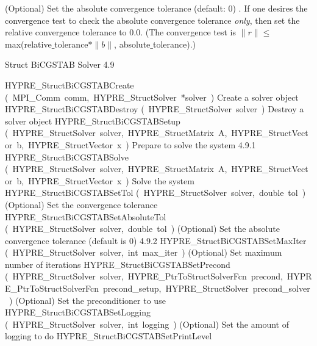 \documentclass{article}
\begin{document}
\begin{cxxentry}
\begin{cxxentry}
\begin{cxxfunction}
\begin{cxxdoc}
(Optional) Set the absolute convergence tolerance (default: 0) .
If one desires
the convergence test to check the absolute convergence tolerance {\it only}, then
set the relative convergence tolerance to 0.0.  (The convergence test is 
$\|r\| \leq$ max(relative$\_$tolerance$\ast \|b\|$, absolute$\_$tolerance).)
\end{cxxdoc}
\end{cxxfunction}
\end{cxxentry}
\begin{cxxentry}
{}
        {Struct BiCGSTAB Solver}
        {}
        {
}
        {4.9}
\begin{cxxnames}
        {HYPRE\_StructBiCGSTABCreate}
        {(\ MPI\_Comm\ comm,\ HYPRE\_StructSolver\ *solver\ )}
        {
Create a solver object}
        {}
\label{cxx.4.9.3}
        {HYPRE\_StructBiCGSTABDestroy}
        {(\ HYPRE\_StructSolver\ solver\ )}
        {
Destroy a solver object}
        {}
\label{cxx.4.9.4}
        {HYPRE\_StructBiCGSTABSetup}
        {(\ HYPRE\_StructSolver\ solver,\ HYPRE\_StructMatrix\ A,\ HYPRE\_StructVector\ b,\ HYPRE\_StructVector\ x\ )}
        {
Prepare to solve the system}
        {4.9.1}
        {HYPRE\_StructBiCGSTABSolve}
        {(\ HYPRE\_StructSolver\ solver,\ HYPRE\_StructMatrix\ A,\ HYPRE\_StructVector\ b,\ HYPRE\_StructVector\ x\ )}
        {
Solve the system}
        {}
\label{cxx.4.9.5}
        {HYPRE\_StructBiCGSTABSetTol}
        {(\ HYPRE\_StructSolver\ solver,\ double\ tol\ )}
        {
(Optional) Set the convergence tolerance}
        {}
\label{cxx.4.9.6}
        {HYPRE\_StructBiCGSTABSetAbsoluteTol}
        {(\ HYPRE\_StructSolver\ solver,\ double\ tol\ )}
        {
(Optional) Set the absolute convergence tolerance (default is 0)}
        {4.9.2}
        {HYPRE\_StructBiCGSTABSetMaxIter}
        {(\ HYPRE\_StructSolver\ solver,\ int\ max\_iter\ )}
        {
(Optional) Set maximum number of iterations}
        {}
\label{cxx.4.9.7}
        {HYPRE\_StructBiCGSTABSetPrecond}
        {(\ HYPRE\_StructSolver\ solver,\ HYPRE\_PtrToStructSolverFcn\ precond,\ HYPRE\_PtrToStructSolverFcn\ precond\_setup,\ HYPRE\_StructSolver\ precond\_solver\ )}
        {
(Optional) Set the preconditioner to use}
        {}
\label{cxx.4.9.8}
        {HYPRE\_StructBiCGSTABSetLogging}
        {(\ HYPRE\_StructSolver\ solver,\ int\ logging\ )}
        {
(Optional) Set the amount of logging to do}
        {}
\label{cxx.4.9.9}
        {HYPRE\_StructBiCGSTABSetPrintLevel}

\end{cxxnames}
\end{cxxentry}
\end{cxxentry}
\end{document}
